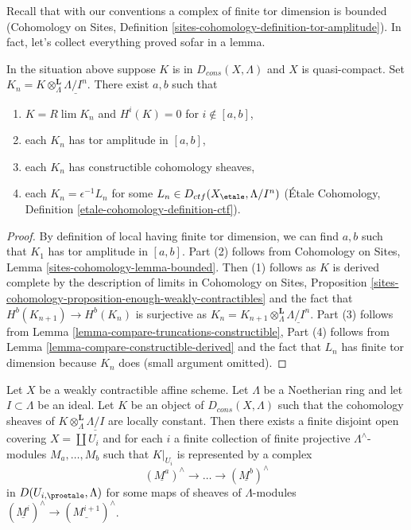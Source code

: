 \noindent
Recall that with our conventions a complex of finite tor dimension
is bounded (Cohomology on Sites, Definition
\ref{sites-cohomology-definition-tor-amplitude}).
In fact, let's collect everything proved sofar in a lemma.

\begin{lemma}
\label{lemma-describe-constructible-complexes}
In the situation above suppose $K$ is in $D_{cons}(X, \Lambda)$
and $X$ is quasi-compact. Set
$K_n = K \otimes_\Lambda^\mathbf{L} \underline{\Lambda/I^n}$.
There exist $a, b$ such that
\begin{enumerate}
\item $K = R\lim K_n$ and $H^i(K) = 0$ for $i \not \in [a, b]$,
\item each $K_n$ has tor amplitude in $[a, b]$,
\item each $K_n$ has constructible cohomology sheaves,
\item each $K_n = \epsilon^{-1}L_n$ for some
$L_n \in D_{ctf}(X_\etale, \Lambda/I^n)$
(\'Etale Cohomology, Definition \ref{etale-cohomology-definition-ctf}).
\end{enumerate}
\end{lemma}

\begin{proof}
By definition of local having finite tor dimension, we can find
$a, b$ such that $K_1$ has tor amplitude in $[a, b]$.
Part (2) follows from 
Cohomology on Sites, Lemma \ref{sites-cohomology-lemma-bounded}.
Then (1) follows as $K$ is derived complete by the description
of limits in
Cohomology on Sites, Proposition
\ref{sites-cohomology-proposition-enough-weakly-contractibles}
and the fact that $H^b(K_{n + 1}) \to H^b(K_n)$ is surjective
as $K_n = K_{n + 1} \otimes^\mathbf{L}_\Lambda \underline{\Lambda/I^n}$.
Part (3) follows from
Lemma \ref{lemma-compare-truncations-constructible},
Part (4) follows from
Lemma \ref{lemma-compare-constructible-derived}
and the fact that $L_n$ has finite tor dimension because $K_n$ does
(small argument omitted).
\end{proof}

\begin{lemma}
\label{lemma-local-structure-constructible-complex}
Let $X$ be a weakly contractible affine scheme. Let $\Lambda$ be a Noetherian
ring and let $I \subset \Lambda$ be an ideal. Let $K$ be an object of
$D_{cons}(X, \Lambda)$ such that the cohomology sheaves of
$K \otimes_\Lambda^\mathbf{L} \underline{\Lambda/I}$ are locally
constant. Then there exists a finite disjoint open covering
$X = \coprod U_i$ and for each $i$ a finite collection of
finite projective $\Lambda^\wedge$-modules $M_a, \ldots, M_b$
such that $K|_{U_i}$ is represented by a complex
$$
(\underline{M^a})^\wedge \to \ldots \to (\underline{M^b})^\wedge
$$
in $D(U_{i, \proetale}, \Lambda)$ for some maps of sheaves of
$\Lambda$-modules $(\underline{M^i})^\wedge \to (\underline{M^{i + 1}})^\wedge$.
\end{lemma}

